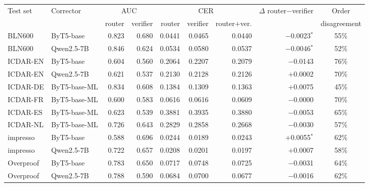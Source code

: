 \begin{tabular}{llrrrrrrc}
\toprule
Test set & Corrector & \multicolumn{2}{c}{AUC} & \multicolumn{3}{c}{CER} & $\Delta$ router$-$verifier & Order \\
 & & router & verifier & router & verifier & router+ver. & & disagreement \\
\midrule
BLN600 & ByT5-base & 0.823 & 0.680 & 0.0441 & 0.0465 & 0.0440 & $-$0.0023$^{*}$ & 55\% \\
BLN600 & Qwen2.5-7B & 0.846 & 0.624 & 0.0534 & 0.0580 & 0.0537 & $-$0.0046$^{*}$ & 52\% \\
ICDAR-EN & ByT5-base & 0.604 & 0.560 & 0.2064 & 0.2207 & 0.2079 & $-$0.0143 & 76\% \\
ICDAR-EN & Qwen2.5-7B & 0.621 & 0.537 & 0.2130 & 0.2128 & 0.2126 & $+$0.0002 & 70\% \\
ICDAR-DE & ByT5-base-ML & 0.834 & 0.608 & 0.1384 & 0.1309 & 0.1363 & $+$0.0075 & 45\% \\
ICDAR-FR & ByT5-base-ML & 0.600 & 0.583 & 0.0616 & 0.0616 & 0.0609 & $-$0.0000 & 70\% \\
ICDAR-ES & ByT5-base-ML & 0.623 & 0.539 & 0.3881 & 0.3935 & 0.3880 & $-$0.0053 & 65\% \\
ICDAR-NL & ByT5-base-ML & 0.726 & 0.643 & 0.2829 & 0.2858 & 0.2668 & $-$0.0030 & 57\% \\
impresso & ByT5-base & 0.588 & 0.696 & 0.0244 & 0.0189 & 0.0243 & $+$0.0055$^{*}$ & 62\% \\
impresso & Qwen2.5-7B & 0.722 & 0.657 & 0.0208 & 0.0201 & 0.0197 & $+$0.0007 & 58\% \\
Overproof & ByT5-base & 0.783 & 0.650 & 0.0717 & 0.0748 & 0.0725 & $-$0.0031 & 64\% \\
Overproof & Qwen2.5-7B & 0.788 & 0.590 & 0.0684 & 0.0700 & 0.0677 & $-$0.0016 & 62\% \\
\bottomrule
\end{tabular}
